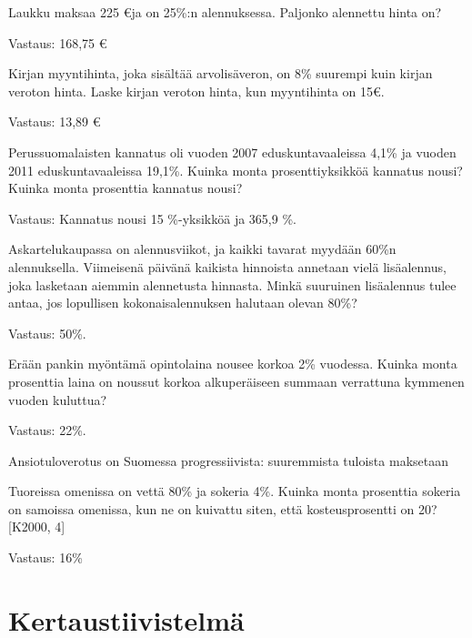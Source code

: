 \begin{tehtava}
Laukku maksaa 225 \euro ja on 25\%:n alennuksessa. Paljonko alennettu hinta on?
\begin{vastaus}
Vastaus: 168,75 \euro
\end{vastaus}
\end{tehtava}

\begin{tehtava}
Kirjan myyntihinta, joka sisältää arvolisäveron, on 8\% suurempi kuin kirjan veroton hinta. Laske kirjan veroton hinta, kun myyntihinta on 15\euro.
\begin{vastaus}
Vastaus: 13,89 \euro
\end{vastaus}
\end{tehtava}

\begin{tehtava}
Perussuomalaisten kannatus oli vuoden 2007 eduskuntavaaleissa 4,1\% ja vuoden 2011 eduskuntavaaleissa 19,1\%. Kuinka monta prosenttiyksikköä kannatus nousi? Kuinka monta prosenttia kannatus nousi?
\begin{vastaus}
Vastaus: Kannatus nousi 15 \%-yksikköä ja 365,9 \%.
\end{vastaus}
\end{tehtava}

\begin{tehtava}
Askartelukaupassa on alennusviikot, ja kaikki tavarat myydään 60\%n alennuksella. Viimeisenä päivänä kaikista hinnoista annetaan vielä lisäalennus, joka lasketaan aiemmin alennetusta hinnasta. Minkä suuruinen lisäalennus tulee antaa, jos lopullisen kokonaisalennuksen halutaan olevan 80\%?
\begin{vastaus}
Vastaus: 50\%.
\end{vastaus}
\end{tehtava}

\begin{tehtava}
Erään pankin myöntämä opintolaina nousee korkoa 2\% vuodessa. Kuinka monta prosenttia laina on noussut korkoa alkuperäiseen summaan verrattuna kymmenen vuoden kuluttua?
\begin{vastaus}
Vastaus: 22\%.
\end{vastaus}
\end{tehtava}

Ansiotuloverotus on Suomessa progressiivista: suuremmista tuloista maksetaan

\begin{tehtava}
Tuoreissa omenissa on vettä 80\% ja sokeria 4\%. Kuinka monta prosenttia sokeria on samoissa omenissa, kun ne on kuivattu siten, että kosteusprosentti on 20? [K2000, 4]
\begin{vastaus}
Vastaus: 16\%
\end{vastaus}
\end{tehtava}

%
%
\chapter{Kertaustiivistelmä}
